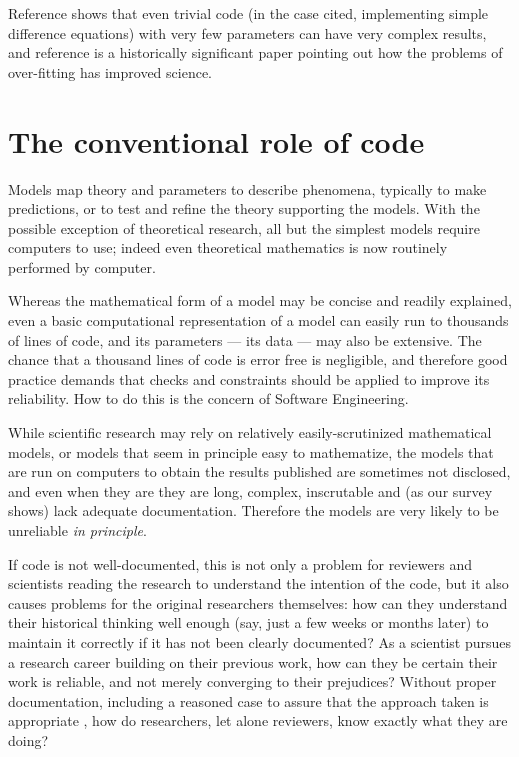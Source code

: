 \documentclass{comjnl}
\begin{document}
Reference \cite{may-simple} shows that even trivial code (in the case cited, implementing simple difference equations) with very few parameters can have very complex results, and reference \cite{dyson} is a historically significant paper pointing out how the problems of over-fitting has improved science.

\section{The conventional role of code}

Models map theory and parameters to describe phenomena, typically to make predictions, or to test and refine the theory supporting the models. With the possible exception of theoretical research, all but the simplest models require computers to use; indeed even theoretical mathematics is now routinely performed by computer.

Whereas the mathematical form of a model may be concise and readily explained, even a basic computational representation of a model can easily run to thousands of lines of code, and its parameters --- its data --- may also be extensive. The chance that a thousand lines of code is error free is negligible, and therefore good practice demands that checks and constraints should be applied to improve its reliability. How to do this is the concern of Software Engineering. 

While scientific research may rely on relatively easily-scrutinized mathematical models, or models that seem in principle easy to mathematize, the models that are run on computers to obtain the results published are sometimes not disclosed, and even when they are they are long, complex, inscrutable and (as our survey shows) lack adequate documentation. Therefore the models are very likely to be unreliable \emph{in principle}. 

If code is not well-documented, this is not only a problem for reviewers and scientists reading the research to understand the intention of the code, but it also causes problems for the original researchers themselves: how can they understand their historical thinking well enough (say, just a few weeks or months later) to maintain it correctly if it has not been clearly documented? As a scientist pursues a research career building on their previous work, how can they be certain their work is reliable, and not merely converging to their  prejudices? Without proper documentation, including a reasoned case to assure that the approach taken is appropriate \cite{assurance-case}, how do researchers, let alone reviewers, know exactly what they are doing?
\end{document}

